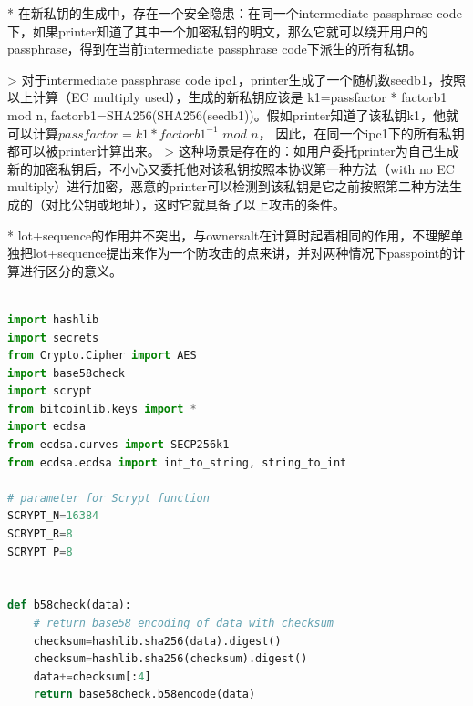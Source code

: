 \documentclass{article}
\begin{document}
* 在新私钥的生成中，存在一个安全隐患：在同一个intermediate passphrase code下，如果printer知道了其中一个加密私钥的明文，那么它就可以绕开用户的passphrase，得到在当前intermediate passphrase code下派生的所有私钥。
  
> 对于intermediate passphrase code ipc1，printer生成了一个随机数seedb1，按照以上计算（EC multiply used），生成的新私钥应该是 k1=passfactor * factorb1 mod n, factorb1=SHA256(SHA256(seedb1))。假如printer知道了该私钥k1，他就可以计算$passfactor=k1 * factorb1^{-1}$ $mod$ $n$， 因此，在同一个ipc1下的所有私钥都可以被printer计算出来。  
> 这种场景是存在的：如用户委托printer为自己生成新的加密私钥后，不小心又委托他对该私钥按照本协议第一种方法（with no EC multiply）进行加密，恶意的printer可以检测到该私钥是它之前按照第二种方法生成的（对比公钥或地址），这时它就具备了以上攻击的条件。

* lot+sequence的作用并不突出，与ownersalt在计算时起着相同的作用，不理解单独把lot+sequence提出来作为一个防攻击的点来讲，并对两种情况下passpoint的计算进行区分的意义。

\begin{lstlisting}[language=python, caption = 下面是用python编写的测试代码, label=lst-baddersig]

import hashlib 
import secrets
from Crypto.Cipher import AES
import base58check
import scrypt
from bitcoinlib.keys import *
import ecdsa
from ecdsa.curves import SECP256k1
from ecdsa.ecdsa import int_to_string, string_to_int

# parameter for Scrypt function
SCRYPT_N=16384
SCRYPT_R=8
SCRYPT_P=8


def b58check(data):
	# return base58 encoding of data with checksum
	checksum=hashlib.sha256(data).digest()
	checksum=hashlib.sha256(checksum).digest()
	data+=checksum[:4]
	return base58check.b58encode(data)
\end{lstlisting}
\end{document}
